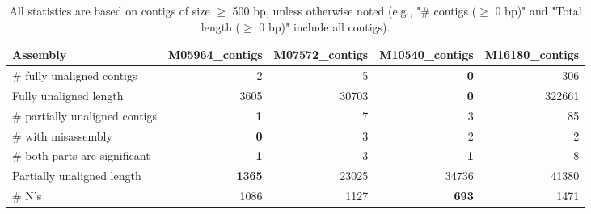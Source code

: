 \documentclass[12pt,a4paper]{article}
\begin{document}
\begin{table}[ht]
\begin{center}
\caption{All statistics are based on contigs of size $\geq$ 500 bp, unless otherwise noted (e.g., "\# contigs ($\geq$ 0 bp)" and "Total length ($\geq$ 0 bp)" include all contigs).}
\begin{tabular}{|l*{4}{|r}|}
\hline
Assembly & M05964\_contigs & M07572\_contigs & M10540\_contigs & M16180\_contigs \\ \hline
\# fully unaligned contigs & 2 & 5 & {\bf 0} & 306 \\ \hline
Fully unaligned length & 3605 & 30703 & {\bf 0} & 322661 \\ \hline
\# partially unaligned contigs & {\bf 1} & 7 & 3 & 85 \\ \hline
\hspace{5mm}\# with misassembly & {\bf 0} & 3 & 2 & 2 \\ \hline
\hspace{5mm}\# both parts are significant & {\bf 1} & 3 & {\bf 1} & 8 \\ \hline
Partially unaligned length & {\bf 1365} & 23025 & 34736 & 41380 \\ \hline
\# N's & 1086 & 1127 & {\bf 693} & 1471 \\ \hline
\end{tabular}
\end{center}
\end{table}
\end{document}

